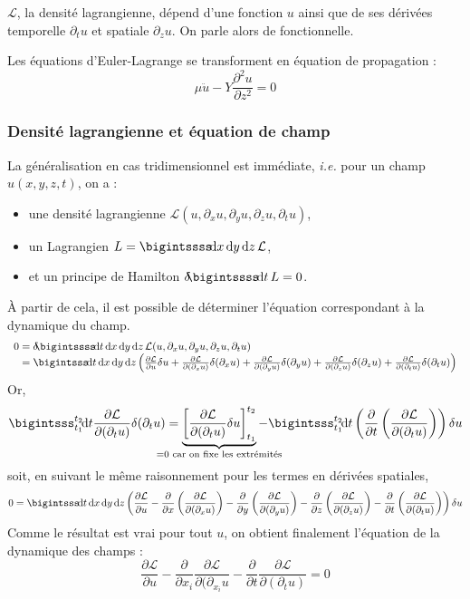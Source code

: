 $\mathcal{L}$, la densité lagrangienne, dépend d'une fonction $u$ ainsi que de ses dérivées temporelle $\partial_t u$ et spatiale $\partial_z u$. On parle alors de fonctionnelle.

Les équations d'Euler-Lagrange se transforment en équation de propagation :
$$
	\mu \ddot{u}-Y\frac{\partial^2u}{\partial z^2}=0
$$

\subsubsection{Densité lagrangienne et équation de champ}
La généralisation en cas tridimensionnel est immédiate, \emph{i.e.} pour un champ $u(x,y,z,t)$, on a :
\begin{itemize}
	\item une densité lagrangienne $\mathcal{L}(u,\partial_x u,\partial_y u,\partial_z u,\partial_t u)$,
	\item un Lagrangien $L=\bigintssss \!\dif x\,\dif y\,\dif z\, \mathcal{L}$,
	\item et un principe de Hamilton $\delta\!\!\bigintssss\!\dif t\, L = 0$.
\end{itemize}
À partir de cela, il est possible de déterminer l'équation correspondant à la dynamique du champ.
$$
	\begin{array}{r@{\;}l}
		0&=\delta\!\!\bigintssss\!\dif t\,\dif x\,\dif y\,\dif z\,\mathcal{L}(u,\partial_x u,\partial_y u,\partial_z u,\partial_t u)\\
			&=\bigintsss\!\dif t\,\dif x\,\dif y\,\dif z \left(\frac{\partial \mathcal{L}}{\partial u}\delta u
				+ \frac{\partial \mathcal{L}}{\partial(\partial_x u)}\delta(\partial_x u)
				+ \frac{\partial \mathcal{L}}{\partial(\partial_y u)}\delta(\partial_y u)
				+ \frac{\partial \mathcal{L}}{\partial(\partial_z u)}\delta(\partial_z u)
				+ \frac{\partial \mathcal{L}}{\partial(\partial_t u)}\delta(\partial_t u)\right)
	\end{array}
$$
Or,
$$
	\bigintsss_{t_1}^{t_2}\!\dif t\frac{\partial \mathcal{L}}{\partial(\partial_t u)}\delta(\partial_t u)
		=\underbrace{\left[\frac{\partial \mathcal{L}}{\partial(\partial_t u)}\delta u\right]^{t_2}_{t_1}}_{\mathclap{=0\text{ car on fixe les extrémités}}}
			-\bigintsss^{t_2}_{t_1}\!\dif t\left(\frac{\partial}{\partial t}\left(\frac{\partial \mathcal{L}}{\partial(\partial_t u)}\right)\right)\delta u
$$
soit, en suivant le même raisonnement pour les termes en dérivées spatiales,
$$
	0=\bigintsss\!\dif t\,\dif x\,\dif y\,\dif z\left(\frac{\partial \mathcal{L}}{\partial u}
		-\frac{\partial}{\partial x}\left(\frac{\partial \mathcal{L}}{\partial(\partial_x u)}\right)
		-\frac{\partial}{\partial y}\left(\frac{\partial \mathcal{L}}{\partial(\partial_y u)}\right)
		-\frac{\partial}{\partial z}\left(\frac{\partial \mathcal{L}}{\partial(\partial_z u)}\right)
		-\frac{\partial}{\partial t}\left(\frac{\partial \mathcal{L}}{\partial(\partial_t u)}\right)\right)\delta u
$$
Comme le résultat est vrai pour tout $u$, on obtient finalement l'équation de la dynamique des champs :
$$
	\boxed{\frac{\partial \mathcal{L}}{\partial u}-\frac{\partial}{\partial x_i}\frac{\partial \mathcal{L}}{\partial(\partial_{x_i}u}-\frac{\partial}{\partial t}\frac{\partial \mathcal{L}}{\partial(\partial_{t}u)}=0}
$$


